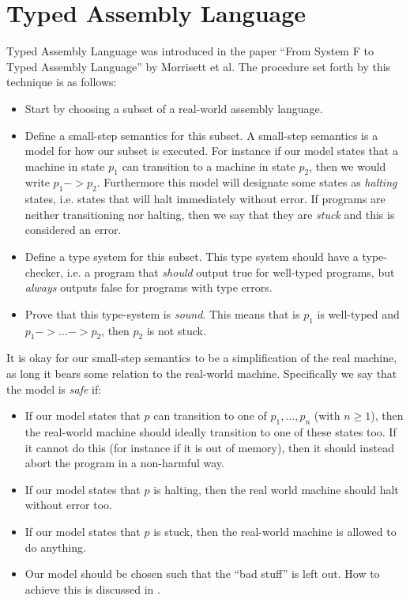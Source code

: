 \section{Typed Assembly Language}

Typed Assembly Language was introduced in the paper ``From System F to Typed
Assembly Language'' by Morrisett et al. The procedure set forth by this
technique is as follows:

\begin{itemize}
\item Start by choosing a subset of a real-world assembly language.
\item Define a small-step semantics for this subset. A small-step semantics is a
  model for how our subset is executed. For instance if our model states that a
  machine in state $p_1$ can transition to a machine in state $p_2$, then we
  would write $p_1 -> p_2$. Furthermore this model will designate some states as
  \emph{halting} states, i.e. states that will halt immediately without
  error. If programs are neither transitioning nor halting, then we say that
  they are \emph{stuck} and this is considered an error.
\item Define a type system for this subset. This type system should have a
  type-checker, i.e. a program that \emph{should} output true for well-typed
  programs, but \emph{always} outputs false for programs with type errors.
\item Prove that this type-system is \emph{sound}. This means that is $p_1$ is
  well-typed and $p_1 -> \dots -> p_2$, then $p_2$ is not stuck.
\end{itemize}

It is okay for our small-step semantics to be a simplification of the real
machine, as long it bears some relation to the real-world machine. Specifically
we say that the model is \emph{safe} if:
\begin{itemize}
\item If our model states that $p$ can transition to one of $p_1, \dots, p_n$
  (with $n \geq 1$), then the real-world machine should ideally transition to
  one of these states too. If it cannot do this (for instance if it is out of
  memory), then it should instead abort the program in a non-harmful way.
\item If our model states that $p$ is halting, then the real world machine
  should halt without error too.
\item If our model states that $p$ is stuck, then the real-world machine is
  allowed to do anything.
\item Our model should be chosen such that the ``bad stuff'' is left out. How to
  achieve this is discussed in .
\end{itemize}

